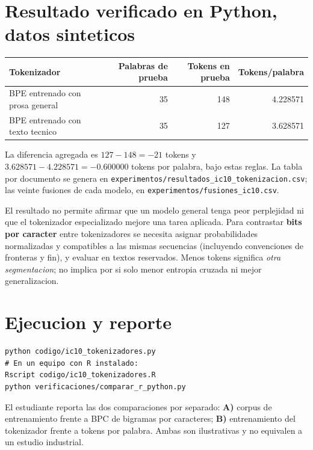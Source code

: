 \section*{Resultado verificado en Python, datos sinteticos}
\begin{center}\begin{tabular}{lrrr}\toprule
Tokenizador & Palabras de prueba & Tokens en prueba & Tokens/palabra\\\midrule
BPE entrenado con prosa general & 35 & 148 & 4.228571\\
BPE entrenado con texto tecnico & 35 & 127 & 3.628571\\\bottomrule
\end{tabular}\end{center}
La diferencia agregada es $127-148=-21$ tokens y
$3.628571-4.228571=-0.600000$ tokens por palabra, bajo estas reglas.
La tabla por documento se genera en
\nolinkurl{experimentos/resultados_ic10_tokenizacion.csv}; las veinte
fusiones de cada modelo, en \nolinkurl{experimentos/fusiones_ic10.csv}.
\begin{verificacion}
El resultado no permite afirmar que un modelo general tenga peor
perplejidad ni que el tokenizador especializado mejore una tarea aplicada.
Para contrastar \textbf{bits por caracter} entre tokenizadores se
necesita asignar probabilidades normalizadas y compatibles a las mismas
secuencias (incluyendo convenciones de fronteras y fin), y evaluar en
textos reservados. Menos tokens significa \emph{otra segmentacion}; no
implica por si solo menor entropia cruzada ni mejor generalizacion.
\end{verificacion}
\section*{Ejecucion y reporte}
\begin{verbatim}
python codigo/ic10_tokenizadores.py
# En un equipo con R instalado:
Rscript codigo/ic10_tokenizadores.R
python verificaciones/comparar_r_python.py
\end{verbatim}
El estudiante reporta las dos comparaciones por separado:
\textbf{A)} corpus de entrenamiento frente a BPC de bigramas por
caracteres; \textbf{B)} entrenamiento del tokenizador frente a tokens por
palabra. Ambas son ilustrativas y no equivalen a un estudio industrial.
